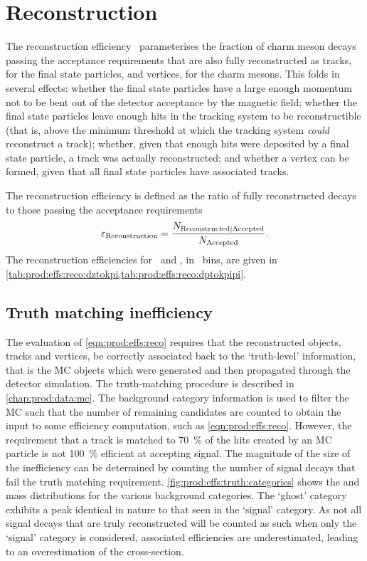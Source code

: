 \section{Reconstruction}
\label{chap:prod:effs:reco}

The reconstruction efficiency \effreco\ parameterises the fraction of charm 
meson decays passing the acceptance requirements that are also fully 
reconstructed as tracks, for the final state particles, and vertices, for the 
charm mesons.
This folds in several effects: whether the final state particles have a large 
enough momentum not to be bent out of the detector acceptance by the magnetic 
field; whether the final state particles leave enough hits in the tracking 
system to be reconstructible (that is, above the minimum threshold at which the 
tracking system \emph{could} reconstruct a track); whether, given that enough 
hits were deposited by a final state particle, a track was actually 
reconstructed; and whether a vertex can be formed, given that all final state 
particles have associated tracks.

The reconstruction efficiency is defined as the ratio of fully reconstructed 
decays to those passing the acceptance requirements
\begin{equation}
  \effreco = \frac{%
    N_{\text{Reconstructed}|\text{Accepted}}
  }
  {%
    N_{\text{\text{Accepted}}}
  }.
  \label{eqn:prod:effs:reco}
\end{equation}
The reconstruction efficiencies for \DzToKpi\ and \DpToKpipi, in \pTy\ bins, are 
given in \cref{tab:prod:effs:reco:dztokpi,tab:prod:effs:reco:dptokpipi}.

\subsection{Truth matching inefficiency}
\label{chap:prod:effs:truth}

The evaluation of \cref{eqn:prod:effs:reco} requires that the reconstructed 
objects, tracks and vertices, be correctly associated back to the `truth-level' 
information, that is the \ac{MC} objects which were generated and then 
propagated through the detector simulation.
The truth-matching procedure is described in \cref{chap:prod:data:mc}.
The background category information is used to filter the \ac{MC} such that the 
number of remaining candidates are counted to obtain the input to some 
efficiency computation, such as \cref{eqn:prod:effs:reco}.
However, the requirement that a track is matched to \SI{70}{\percent} of the 
hits created by an \ac{MC} particle is not \SI{100}{\percent} efficient at 
accepting signal.
The magnitude of the size of the inefficiency can be determined by counting the 
number of signal decays that fail the truth matching requirement.
\cref{fig:prod:effs:truth:categories} shows the \PDzero and \PDplus mass 
distributions for the various background categories.
The `ghost' category exhibits a peak identical in nature to that seen in the 
`signal' category.
As not all signal decays that are truly reconstructed will be counted as such 
when only the `signal' category is considered, associated efficiencies are 
underestimated, leading to an overestimation of the cross-section.

